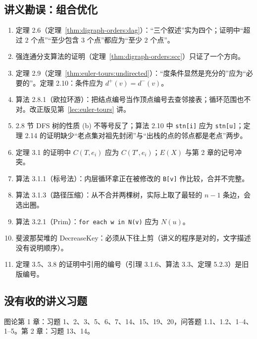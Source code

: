 \subsection*{讲义勘误：组合优化}

\begin{enumerate}
\item 定理 2.6（定理~\ref{thm:digraph-orders:dag}）：“三个叙述”实为四个；证明中“超过 $2$ 个点”“至少包含 $3$ 个点”都应为“至少 $2$ 个点”。
\item 强连通分支算法的证明（定理~\ref{thm:digraph-orders:scc}）只证了一个方向。
\item 定理 2.9（定理~\ref{thm:euler-tours:undirected}）：“度条件显然是充分的”应为“必要的”。定理 2.10：条件应为 $d^+(v)=d^-(v)$。
\item 算法 2.8.1（欧拉环游）：把结点编号当作顶点编号去查邻接表；循环范围也不对。改正版见第~\ref{lec:euler-tours} 讲。
\item 2.8 节 DFS 树的性质 (b) 不等号反了；算法 2.10 中 \texttt{stn[i]} 应为 \texttt{stn[u]}；定理 2.14 的证明缺少“老点集对祖先封闭”与“出栈的点的邻点都是老点”两步。
\item 定理 3.1 的证明中 $C(T,e_i)$ 应为 $C(T',e_i)$；$E(X)$ 与第 2 章的记号冲突。
\item 算法 3.1.1（标号法）：内层循环拿正在被修改的 \texttt{B[v]} 作比较，合并不完整。
\item 算法 3.1.3（路径压缩）：从不合并两棵树，实际上取了最轻的 $n-1$ 条边，会选出圈。
\item 算法 3.2.1（Prim）：\texttt{for each w in N(v)} 应为 $N(u)$。
\item 斐波那契堆的 DecreaseKey：必须从下往上剪（讲义的程序是对的，文字描述没有说明顺序）。
\item 定理 3.5、3.8 的证明中引用的编号（引理 3.1.6、算法 3.3、定理 5.2.3）是旧版编号。
\end{enumerate}

\subsection*{没有收的讲义习题}

图论第 1 章：习题 1、2、3、5、6、7、14、15、19、20，问答题 1.1、1.2、1--4、1--5。第 2 章：习题 13、14。
